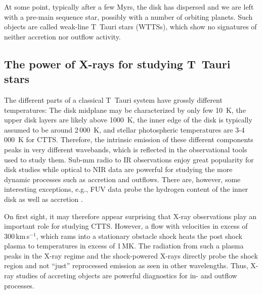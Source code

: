 At some point, typically after a few Myrs, the disk has dispersed \citep{2009AIPC.1158....3M} and we are left with a pre-main sequence star, possibly with a number of orbiting planets. Such objects are called weak-line T~Tauri stars (WTTSs), which show no signatures of neither accretion nor outflow activity.

\subsection{The power of X-rays for studying T~Tauri stars}
The different parts of a classical T~Tauri system have grossly different temperatures: The disk midplane may be characterized by only few 10~K, the upper disk layers are likely above 1000~K, the inner edge of the disk is typically assumed to be around 2\,000~K, and stellar photospheric temperatures are 3-4\,000~K for CTTS. Therefore, the intrinsic emission of these different components peaks in very different wavebands, which is reflected in the observational tools used to study them. Sub-mm radio to IR observations enjoy great popularity for disk studies while optical to NIR data are powerful for studying the more dynamic processes such as accretion and outflows. There are, however, some interesting exceptions, e.g., FUV data probe the hydrogen content of the inner disk as well as accretion \citep[see review in][]{Schneider_2020}.

On first sight, it may therefore appear surprising that X-ray observations play an important role for studying CTTS. However, a flow with velocities in excess of 300\,km\,s$^{-1}$, which rams into a stationary obstacle shock heats the post shock plasma to temperatures in excess of 1\,MK. The radiation from such a plasma peaks in the X-ray regime and the shock-powered X-rays directly probe the shock region and not ``just'' reprocessed emission as seen in other wavelengths. Thus,  X-ray studies of accreting objects are powerful diagnostics for in- and outflow processes. 
